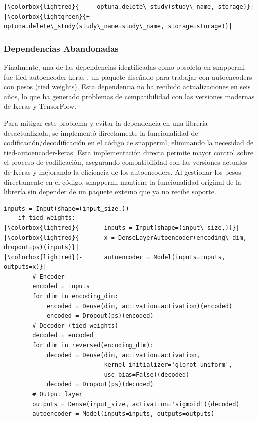 \begin{verbatim}
|\colorbox{lightred}{-    optuna.delete\_study(study\_name, storage)}|
|\colorbox{lightgreen}{+    optuna.delete\_study(study\_name=study\_name, storage=storage)}|
\end{verbatim}

\subsubsection{Dependencias Abandonadas}
Finalmente, una de las dependencias identificadas como obsoleta en \Gls{snapperml} fue tied autoencoder keras \cite{tiedweights}, un paquete diseñado para trabajar con autoencoders con pesos  (tied weights). Esta dependencia no ha recibido actualizaciones en seis años, lo que ha generado problemas de compatibilidad con las versiones modernas de Keras y TensorFlow.

\vspace{4mm}

Para mitigar este problema y evitar la dependencia en una librería desactualizada, se implementó directamente la funcionalidad de codificación/decodificación en el código de \Gls{snapperml}, eliminando la necesidad de tied-autoencoder-keras. Esta implementación directa permite mayor control sobre el proceso de codificación, asegurando compatibilidad con las versiones actuales de Keras y mejorando la eficiencia de los autoencoders. Al gestionar los pesos directamente en el código, \Gls{snapperml} mantiene la funcionalidad original de la librería sin depender de un paquete externo que ya no recibe soporte.

\begin{verbatim}
inputs = Input(shape=(input_size,))
    if tied_weights:
|\colorbox{lightred}{-      inputs = Input(shape=(input\_size,))}|
|\colorbox{lightred}{-      x = DenseLayerAutoencoder(encoding\_dim, dropout=ps)(inputs)}|
|\colorbox{lightred}{-      autoencoder = Model(inputs=inputs, outputs=x)}|
        # Encoder
        encoded = inputs
        for dim in encoding_dim:
            encoded = Dense(dim, activation=activation)(encoded)
            encoded = Dropout(ps)(encoded)
        # Decoder (tied weights)
        decoded = encoded
        for dim in reversed(encoding_dim):
            decoded = Dense(dim, activation=activation,
                            kernel_initializer='glorot_uniform',
                            use_bias=False)(decoded)
            decoded = Dropout(ps)(decoded)
        # Output layer
        outputs = Dense(input_size, activation='sigmoid')(decoded)
        autoencoder = Model(inputs=inputs, outputs=outputs)
\end{verbatim}

